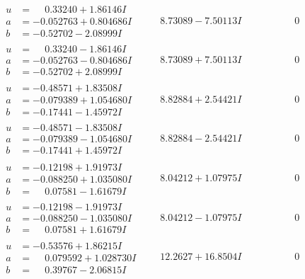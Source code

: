\documentclass[1p]{elsarticle_modified}
\theoremstyle{definition}
\begin{document}
$$\begin{array}{c|c|c}
\begin{aligned}
u &= \phantom{-}0.33240 + 1.86146 I \\
a &= -0.052763 + 0.804686 I \\
b &= -0.52702 - 2.08999 I\end{aligned}
 & \phantom{-}8.73089 - 7.50113 I & \phantom{-0.000000 } 0 \\ \hline\begin{aligned}
u &= \phantom{-}0.33240 - 1.86146 I \\
a &= -0.052763 - 0.804686 I \\
b &= -0.52702 + 2.08999 I\end{aligned}
 & \phantom{-}8.73089 + 7.50113 I & \phantom{-0.000000 } 0 \\ \hline\begin{aligned}
u &= -0.48571 + 1.83508 I \\
a &= -0.079389 + 1.054680 I \\
b &= -0.17441 - 1.45972 I\end{aligned}
 & \phantom{-}8.82884 + 2.54421 I & \phantom{-0.000000 } 0 \\ \hline\begin{aligned}
u &= -0.48571 - 1.83508 I \\
a &= -0.079389 - 1.054680 I \\
b &= -0.17441 + 1.45972 I\end{aligned}
 & \phantom{-}8.82884 - 2.54421 I & \phantom{-0.000000 } 0 \\ \hline\begin{aligned}
u &= -0.12198 + 1.91973 I \\
a &= -0.088250 + 1.035080 I \\
b &= \phantom{-}0.07581 - 1.61679 I\end{aligned}
 & \phantom{-}8.04212 + 1.07975 I & \phantom{-0.000000 } 0 \\ \hline\begin{aligned}
u &= -0.12198 - 1.91973 I \\
a &= -0.088250 - 1.035080 I \\
b &= \phantom{-}0.07581 + 1.61679 I\end{aligned}
 & \phantom{-}8.04212 - 1.07975 I & \phantom{-0.000000 } 0 \\ \hline\begin{aligned}
u &= -0.53576 + 1.86215 I \\
a &= \phantom{-}0.079592 + 1.028730 I \\
b &= \phantom{-}0.39767 - 2.06815 I\end{aligned}
 & \phantom{-}12.2627 + 16.8504 I & \phantom{-0.000000 } 0 \\ \hline\begin{aligned}

\end{aligned}
\end{array}$$
\end{document}

